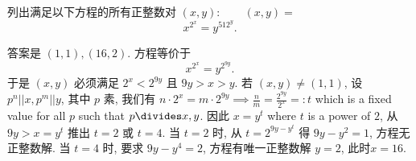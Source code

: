 \begin{prob}
\label{prob:prob-8}
列出满足以下方程的所有正整数对 $(x, y): \qquad (x,y) = $
\[
x^{2^x} = y^{512^y}.
\]
\end{prob}

\begin{soln}
答案是 $\boxed{(1, 1), (16, 2).}$ 方程等价于
\[
x^{2^x} = y^{2^{9y}}.
\]
于是 $(x, y)$ 必须满足 $2^x < 2^{9y}$ 且 $9y > x > y$.
若 $(x,y) \ne (1,1)$, 设 $p^n || x, p^m || y$, 其中 $p$ 素,
我们有 $n\cdot 2^x = m\cdot 2^{9y} \implies \frac{n}{m} = \frac{2^{9y}}{2^x} =: t$
which is a fixed value for all $p$ such that $p \divides x, y$.
因此 $x = y^t$ where $t$ is a power of $2$,
从 $9y > x = y^t$ 推出 $t = 2$ 或 $t = 4$.
当 $t = 2$ 时, 从 $t = 2^{9y - y^t}$ 得 $9y - y^2 = 1$,
方程无正整数解. 当 $t = 4$ 时, 要求 $9y - y^4 = 2$,
方程有唯一正整数解 $y = 2$, 此时$ x = 16$.
\end{soln}
